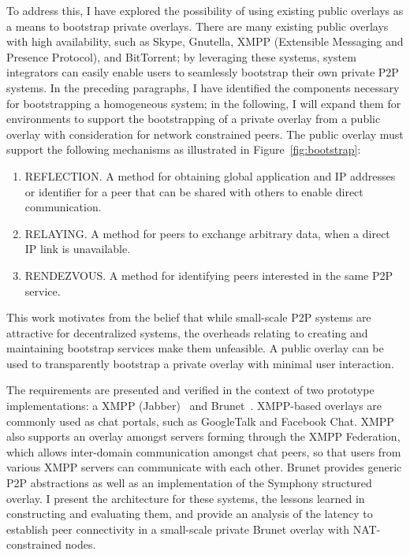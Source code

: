 To address this, I have explored the possibility of using existing public
overlays as a means to bootstrap private overlays.  There are many existing
public overlays with high availability, such as Skype, Gnutella, XMPP
(Extensible Messaging and Presence Protocol), and BitTorrent; by leveraging
these systems, system integrators can easily enable users to seamlessly
bootstrap their own private P2P systems.  In the preceding paragraphs, I have
identified the components necessary for bootstrapping a homogeneous system; in
the following, I will expand them for environments to support the bootstrapping
of a private overlay from a public overlay with consideration for network
constrained peers.  The public overlay must support the following mechanisms as
illustrated in Figure~\ref{fig:bootstrap}:

\begin{enumerate}

\item REFLECTION. A method for obtaining global application and IP addresses or
identifier for a peer that can be shared with others to enable direct
communication.

\item RELAYING. A method for peers to exchange arbitrary data, when a direct IP
link is unavailable.

\item RENDEZVOUS. A method for identifying peers interested in the same P2P
service.

\end{enumerate}

This work motivates from the belief that while small-scale P2P systems are
attractive for decentralized systems, the overheads relating to creating and
maintaining bootstrap services make them unfeasible.  A public overlay can be
used to transparently bootstrap a private overlay with minimal user
interaction.

The requirements are presented and verified in the context of two prototype
implementations: a XMPP (Jabber)~\cite{xmpp} and Brunet~\cite{brunet}.
XMPP-based overlays are commonly used as chat portals, such as GoogleTalk and
Facebook Chat.  XMPP also supports an overlay amongst servers forming through
the XMPP Federation, which allows inter-domain communication amongst chat
peers, so that users from various XMPP servers can communicate with each other.
Brunet provides generic P2P abstractions as well as an implementation of the
Symphony structured overlay.  I present the architecture for these systems, the
lessons learned in constructing and evaluating them, and provide an analysis of
the latency to establish peer connectivity in a small-scale private Brunet
overlay with NAT-constrained nodes.

